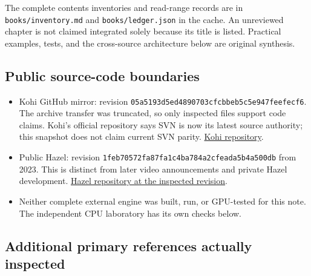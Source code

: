 The complete contents inventories and read-range records are in \texttt{books/inventory.md} and \texttt{books/ledger.json} in the cache. An unreviewed chapter is not claimed integrated solely because its title is listed. Practical examples, tests, and the cross-source architecture below are original synthesis.

\subsection{Public source-code boundaries}\label{public-source-code-boundaries}

\begin{itemize}
\tightlist
\item
  Kohi GitHub mirror: revision \texttt{05a5193d5ed4890703cfcbbeb5c5e947feefecf6}. The archive transfer was truncated, so only inspected files support code claims. Kohi's official repository says SVN is now its latest source authority; this snapshot does not claim current SVN parity. \href{https://github.com/travisvroman/kohi}{Kohi repository}.
\item
  Public Hazel: revision \texttt{1feb70572fa87fa1c4ba784a2cfeada5b4a500db} from 2023. This is distinct from later video announcements and private Hazel development. \href{https://github.com/TheCherno/Hazel/tree/1feb70572fa87fa1c4ba784a2cfeada5b4a500db}{Hazel repository at the inspected revision}.
\item
  Neither complete external engine was built, run, or GPU-tested for this note. The independent CPU laboratory has its own checks below.
\end{itemize}

\subsection{Additional primary references actually inspected}\label{additional-primary-references-actually-inspected}

